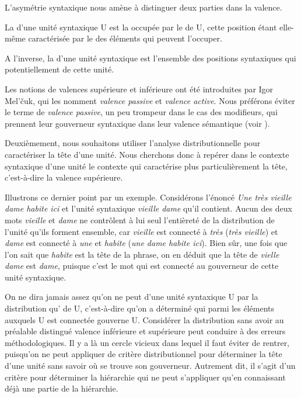 L’asymétrie syntaxique nous amène à distinguer deux parties dans la valence.

{La  d’une unité syntaxique U est la  occupée par le  de U, cette position étant elle-même caractérisée par le  des éléments qui peuvent l’occuper.}

{A l’inverse, la  d’une unité syntaxique est l’ensemble des positions syntaxiques qui  potentiellement de cette unité.}

Les notions de valences supérieure et inférieure ont été introduites par Igor Mel’čuk, qui les nomment \textit{valence passive} et \textit{valence active}. Nous préférons éviter le terme de \textit{valence passive}, un peu trompeur dans le cas des modifieurs, qui prennent leur gouverneur syntaxique dans leur valence sémantique (voir ).

Deuxièmement, nous souhaitons utiliser l’analyse distributionnelle pour caractériser la tête d’une unité. Nous cherchons donc à repérer dans le contexte syntaxique d’une unité le contexte qui caractérise plus particulièrement la tête, c’est-à-dire la valence supérieure.

Illustrons ce dernier point par un exemple. Considérons l’énoncé \textit{Une très vieille dame habite ici} et l’unité syntaxique \textit{vieille dame} qu’il contient. Aucun des deux mots \textit{vieille} et \textit{dame} ne contrôlent à lui seul l’entièreté de la distribution de l’unité qu’ils forment ensemble, car \textit{vieille} est connecté à \textit{très} (\textit{très vieille}) et \textit{dame} est connecté à \textit{une} et \textit{habite} (\textit{une dame habite ici}). Bien sûr, une fois que l’on sait que \textit{habite} est la tête de la phrase, on en déduit que la tête de \textit{vielle dame} est \textit{dame}, puisque c’est le mot qui est connecté au gouverneur de cette unité syntaxique.

On ne dira jamais assez qu’on ne peut  d’une unité syntaxique U par la distribution qu’  de U, c’est-à-dire qu’on a déterminé qui parmi les éléments auxquels U est connectée gouverne U. Considérer la distribution sans avoir au préalable distingué valence inférieure et supérieure peut conduire à des erreurs méthodologiques. Il y a là un cercle vicieux dans lequel il faut éviter de rentrer, puisqu’on ne peut appliquer de critère distributionnel pour déterminer la tête d’une unité sans savoir où se trouve son gouverneur. Autrement dit, il s’agit d’un critère pour déterminer la hiérarchie qui ne peut s’appliquer qu'en connaissant déjà une partie de la hiérarchie.

